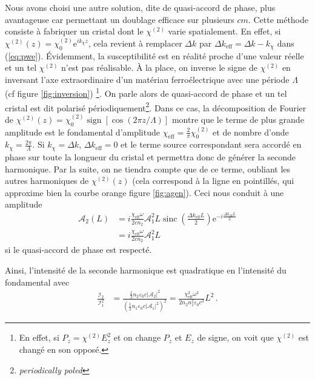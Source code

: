 \documentclass[11pt,a4paper]{article}
\newcommand{\A}{\mathcal{A}}
\newcommand{\e}[1]{\text{e}^{#1}}
\newcommand{\mathsc}[1]{\mathrm{\scriptscriptstyle {#1}}}
\begin{document}
\enlargethispage{2\baselineskip}
Nous avons choisi une autre solution, dite de quasi-accord de phase, plus avantageuse car permettant un doublage efficace sur plusieurs $\unit{cm}$. Cette méthode consiste à fabriquer un cristal dont le $\chi^{(2)}$ varie spatialement. En effet, si $\chi^{(2)}(z) = \chi^{(2)}_0 \e{i k_\chi z}$, cela revient à remplacer $\Delta k$ par $\boxed{ \Delta k_\mathsc{eff} = \Delta k - k_\chi }$ dans (\ref{eq:pwe}). 
Évidemment, la susceptibilité est en réalité proche d'une valeur réelle et un tel $\chi^{(2)}$ n'est pas réalisable. À la place, on inverse le signe de $\chi^{(2)}$ en inversant l'axe extraordinaire d'un matériau ferroélectrique avec une période $\Lambda$ (cf figure \ref{fig:inversion}) \footnote{En effet, si $P_z = \chi^{(2)} E_z^2$ et on change $P_z$ et $E_z$ de signe, on voit que $\chi^{(2)}$ est changé en son opposé.}.
On parle alors de quasi-accord de phase et un tel cristal est dit polarisé périodiquement\footnote{\textit{periodically poled}}. Dans ce cas, la décomposition de Fourier de $\chi^{(2)}(z) = \chi^{(2)}_0 \operatorname{sign}[\cos(2\pi z/ \Lambda)]$ montre que le terme de plus grande amplitude est le fondamental d'amplitude $\boxed{ \chi_\mathsc{eff} = \frac2\pi \chi^{(2)}_0 }$ et de nombre d'onde $\boxed{ k_\chi = \frac{2\pi}{\Lambda} }$. 
Si $k_\chi = \Delta k$, $\Delta k_\mathsc{eff} = 0$ et le terme source correspondant sera accordé en phase sur toute la longueur du cristal et permettra donc de générer la seconde harmonique. Par la suite, on ne tiendra compte que de ce terme, oubliant les autres harmoniques de $\chi^{(2)}(z)$ (cela correspond à la ligne en pointillés, qui approxime bien la courbe orange figure \ref{fig:agen}).
Ceci nous conduit à une amplitude 
\begin{align}
	\A_2(L) &= i \frac{\chi_\mathsc{eff}\omega}{2 cn_2} \A_1^2 L \operatorname{sinc}\left( \frac{\Delta k_\mathsc{eff} L}{2} \right) 
	\e{-i\frac{\Delta k_\mathsc{eff} L}{2}} \\	
	&= i \frac{\chi_\mathsc{eff} \omega}{2 cn_2} \A_1^2L 
\end{align}
si le quasi-accord de phase est respecté.

Ainsi, l'intensité de la seconde harmonique est quadratique en l'intensité du fondamental avec
\begin{align}
	\frac{\mathcal I_2}{\mathcal I_1^2} &= \frac{\frac12 n_2 \varepsilon_0 c |\A_2|^2}{\left(\frac12 n_1 \varepsilon_0 c |\A_1|^2\right)^2} 
	= \frac{\chi_\mathsc{eff}^2\omega^2}{2 n_2 n_1^2 \varepsilon_0 c^3} L^2 \,.
	\label{eq:plane}
\end{align}
\end{document}
